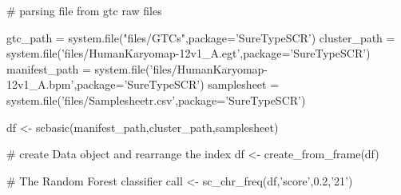 \documentclass[a4paper]{book}
\begin{document}
\begin{Examples}
\begin{ExampleCode}

# parsing file from gtc raw files

gtc_path = system.file("files/GTCs",package='SureTypeSCR')
cluster_path = system.file('files/HumanKaryomap-12v1_A.egt',package='SureTypeSCR')
manifest_path = system.file('files/HumanKaryomap-12v1_A.bpm',package='SureTypeSCR')
samplesheet = system.file('files/Samplesheetr.csv',package='SureTypeSCR')

df <- scbasic(manifest_path,cluster_path,samplesheet)


# create Data object and rearrange the index
df <- create_from_frame(df)

# The Random Forest classifier
call <- sc_chr_freq(df,'score',0.2,'21') 




\end{ExampleCode}
\end{Examples}
\printindex{}
\end{document}

